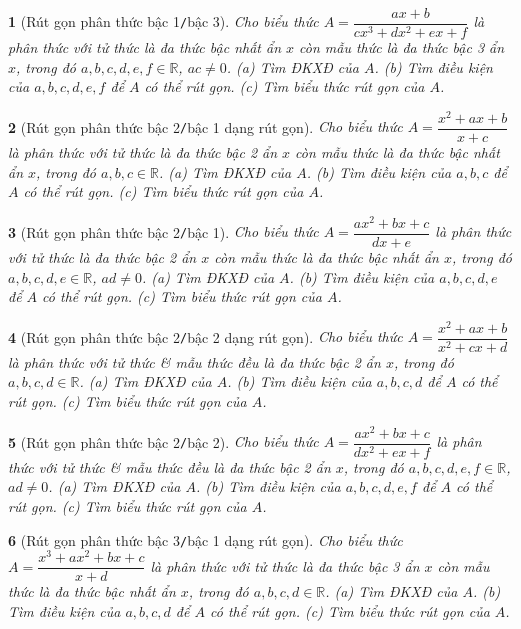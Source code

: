 \documentclass{article}
\newtheorem{baitoan}{}
\begin{document}
\begin{baitoan}[Rút gọn phân thức bậc 1{\tt/}bậc 3]
	Cho biểu thức $A = \dfrac{ax + b}{cx^3 + dx^2 + ex + f}$ là phân thức với tử thức là đa thức bậc nhất ẩn $x$ còn mẫu thức là đa thức bậc 3 ẩn $x$, trong đó $a,b,c,d,e,f\in\mathbb{R}$, $ac\ne0$. (a) Tìm {\rm ĐKXĐ} của $A$. (b) Tìm điều kiện của $a,b,c,d,e,f$ để $A$ có thể rút gọn. (c) Tìm biểu thức rút gọn của $A$.
\end{baitoan}

\begin{baitoan}[Rút gọn phân thức bậc 2{\tt/}bậc 1 dạng rút gọn]
	Cho biểu thức $A = \dfrac{x^2 + ax + b}{x + c}$ là phân thức với tử thức là đa thức bậc 2 ẩn $x$ còn mẫu thức là đa thức bậc nhất ẩn $x$, trong đó $a,b,c\in\mathbb{R}$. (a) Tìm {\rm ĐKXĐ} của $A$. (b) Tìm điều kiện của $a,b,c$ để $A$ có thể rút gọn. (c) Tìm biểu thức rút gọn của $A$.
\end{baitoan}

\begin{baitoan}[Rút gọn phân thức bậc 2{\tt/}bậc 1]
	Cho biểu thức $A = \dfrac{ax^2 + bx + c}{dx + e}$ là phân thức với tử thức là đa thức bậc 2 ẩn $x$ còn mẫu thức là đa thức bậc nhất ẩn $x$, trong đó $a,b,c,d,e\in\mathbb{R}$, $ad\ne0$. (a) Tìm {\rm ĐKXĐ} của $A$. (b) Tìm điều kiện của $a,b,c,d,e$ để $A$ có thể rút gọn. (c) Tìm biểu thức rút gọn của $A$.
\end{baitoan}

\begin{baitoan}[Rút gọn phân thức bậc 2{\tt/}bậc 2 dạng rút gọn]
	Cho biểu thức $A = \dfrac{x^2 + ax + b}{x^2 + cx + d}$ là phân thức với tử thức \& mẫu thức đều là đa thức bậc 2 ẩn $x$, trong đó $a,b,c,d\in\mathbb{R}$. (a) Tìm {\rm ĐKXĐ} của $A$. (b) Tìm điều kiện của $a,b,c,d$ để $A$ có thể rút gọn. (c) Tìm biểu thức rút gọn của $A$.
\end{baitoan}

\begin{baitoan}[Rút gọn phân thức bậc 2{\tt/}bậc 2]
	Cho biểu thức $A = \dfrac{ax^2 + bx + c}{dx^2 + ex + f}$ là phân thức với tử thức \& mẫu thức đều là đa thức bậc 2 ẩn $x$, trong đó $a,b,c,d,e,f\in\mathbb{R}$, $ad\ne0$. (a) Tìm {\rm ĐKXĐ} của $A$. (b) Tìm điều kiện của $a,b,c,d,e,f$ để $A$ có thể rút gọn. (c) Tìm biểu thức rút gọn của $A$.
\end{baitoan}

\begin{baitoan}[Rút gọn phân thức bậc 3{\tt/}bậc 1 dạng rút gọn]
	Cho biểu thức $A = \dfrac{x^3 + ax^2 + bx + c}{x + d}$ là phân thức với tử thức là đa thức bậc 3 ẩn $x$ còn mẫu thức là đa thức bậc nhất ẩn $x$, trong đó $a,b,c,d\in\mathbb{R}$. (a) Tìm {\rm ĐKXĐ} của $A$. (b) Tìm điều kiện của $a,b,c,d$ để $A$ có thể rút gọn. (c) Tìm biểu thức rút gọn của $A$.
\end{baitoan}
\end{document}

